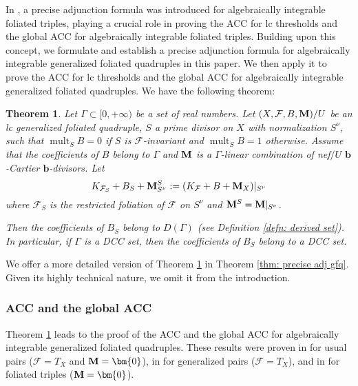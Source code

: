 \documentclass[11pt]{amsart}
\numberwithin{equation}{section}
\newcommand{\bb}{\bm{b}}
\newcommand{\Mm}{{\bf{M}}}
\newcommand{\mult}{\operatorname{mult}}
\newcommand{\Ff}{\mathcal{F}}
\newcommand{\Ii}{\Gamma}
\newtheorem{thm}{Theorem}[subsection]
\theoremstyle{definition}
\theoremstyle{definition}
\theoremstyle{definition}
\begin{document}
In \cite[Theorem 1.6]{DLM23}, a precise adjunction formula was introduced for algebraically integrable foliated triples, playing a crucial role in proving the ACC for lc thresholds and the global ACC for algebraically integrable foliated triples. Building upon this concept, we formulate and establish a precise adjunction formula for algebraically integrable generalized foliated quadruples in this paper. We then apply it to prove the ACC for lc thresholds and the global ACC for algebraically integrable generalized foliated quadruples. We have the following theorem:

\begin{thm}\label{thm: dcc adjunction is dcc}
Let $\Ii\subset [0,+\infty)$ be a set of real numbers. Let $(X,\Ff,B,\Mm)/U$ be an lc generalized foliated quadruple, $S$ a prime divisor on $X$ with normalization $S^\nu$, such that $\mult_SB=0$ if $S$ is $\Ff$-invariant and $\mult_SB=1$ otherwise. Assume that the coefficients of $B$ belong to $\Ii$ and $\Mm$ is a $\Ii$-linear combination of nef$/U$ $\bb$-Cartier $\bb$-divisors. Let
 $$K_{\Ff_S}+B_S+\Mm^S_{S^\nu}:=(K_{\Ff}+B+\Mm_X)|_{S^\nu}$$
where $\Ff_S$ is the restricted foliation of $\Ff$ on $S^\nu$ and $\Mm^S=\Mm|_{S^\nu}$.

Then the coefficients of $B_S$ belong to $D(\Ii)$ (see Definition \ref{defn: derived set}). In particular, if $\Ii$ is a DCC set, then the coefficients of $B_S$ belong to a DCC set.
\end{thm}

We offer a more detailed version of Theorem \ref{thm: dcc adjunction is dcc} in Theorem \ref{thm: precise adj gfq}. Given its highly technical nature, we omit it from the introduction. 

\subsubsection{ACC and the global ACC} Theorem \ref{thm: dcc adjunction is dcc} leads to the proof of the ACC and the global ACC for algebraically integrable generalized foliated quadruples. These results were proven in \cite{HMX14} for usual pairs ($\Ff=T_X$ and $\Mm=\bm{0}$), in \cite{BZ16} for generalized pairs ($\Ff=T_X$), and in \cite{DLM23} for foliated triples ($\Mm=\bm{0}$).
\end{document}
